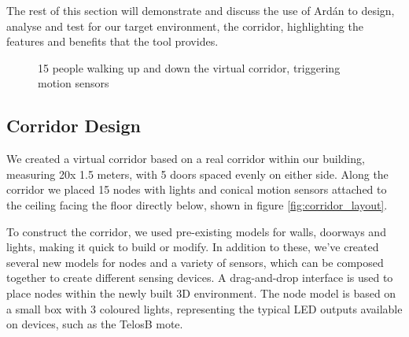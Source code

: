 The rest of this section will demonstrate and discuss the use of Ard\'{a}n to design, analyse and test for our target environment, the corridor, highlighting the features and benefits that the tool provides.


\begin{figure}[t]
  \centering
  \caption{15 people walking up and down the virtual corridor, triggering motion sensors}
  \label{fig:views}
\end{figure}


\subsection{Corridor Design}
\label{sub:Constructing the corridor}
We created a virtual corridor based on a real corridor within our building, measuring 20x 1.5 meters, with 5 doors spaced evenly on either side. Along the corridor we placed 15 nodes with lights and conical motion sensors attached to the ceiling facing the floor directly below, shown in figure \ref{fig:corridor_layout}.

To construct the corridor, we used pre-existing models for walls, doorways and lights, making it quick to build or modify. In addition to these, we've created several new models for nodes and a variety of sensors, which can be composed together to create different sensing devices. A drag-and-drop interface is used to place nodes within the newly built 3D environment. The node model is based on a small box with 3 coloured lights, representing the typical LED outputs available on devices, such as the TelosB mote.

